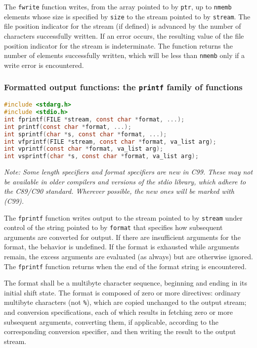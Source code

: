The \texttt{fwrite} function writes, from the array pointed to by \texttt{ptr},
up to \texttt{nmemb} elements whose size is specified by \texttt{size} to the
stream pointed to by \texttt{stream}. The file position indicator for the
stream (if defined) is advanced by the number of characters successfully
written. If an error occurs, the resulting value of the file position indicator
for the stream is indeterminate. The function returns the number of elements
successfully written, which will be less than \texttt{nmemb} only if a write
error is encountered.

\subsubsection{Formatted output functions: the \texttt{printf} family of functions}
\lstset{basicstyle=\scriptsize, numbers=left, captionpos=b, tabsize=4}
\begin{lstlisting}[caption=Section \thesection listing \arabic{filecnt},language={C},
breaklines=true,xleftmargin=15pt,label=lst:section\thesection listing\arabic{filecnt}]
#include <stdarg.h>
#include <stdio.h>
int fprintf(FILE *stream, const char *format, ...);
int printf(const char *format, ...);
int sprintf(char *s, const char *format, ...);
int vfprintf(FILE *stream, const char *format, va_list arg);
int vprintf(const char *format, va_list arg);
int vsprintf(char *s, const char *format, va_list arg);
\end{lstlisting}

\emph{Note: Some length specifiers and format specifiers are new in C99. These
may not be available in older compilers and versions of the stdio library,
which adhere to the C89/C90 standard. Wherever possible, the new ones will be
marked with (C99).}

The \texttt{fprintf} function writes output to the stream pointed to by
\texttt{stream} under control of the string pointed to by \texttt{format} that
specifies how subsequent arguments are converted for output. If there are
insufficient arguments for the format, the behavior is undefined. If the format
is exhausted while arguments remain, the excess arguments are evaluated (as
always) but are otherwise ignored. The \texttt{fprintf} function returns when
the end of the format string is encountered.

The format shall be a multibyte character sequence, beginning and ending in its
initial shift state. The format is composed of zero or more directives:
ordinary multibyte characters (not \texttt{\%}), which are copied unchanged to
the output stream; and conversion specifications, each of which results in
fetching zero or more subsequent arguments, converting them, if applicable,
according to the corresponding conversion specifier, and then writing the
result to the output stream.

